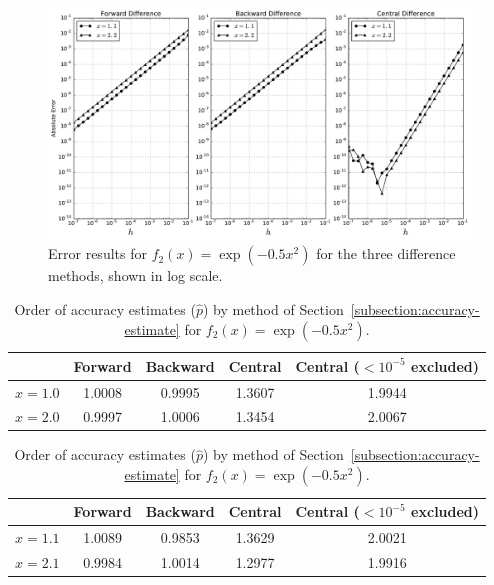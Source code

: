 \documentclass[11pt]{article}
\begin{document}
\begin{figure}[!hb]
    \centering
    \includegraphics[width=\textwidth]{../figures/f2.pdf}
    \caption{Error results for $f_2(x) = \exp(-0.5x^2)$ for the three difference methods, shown in log scale.}
    \label{fig:func2-results}
\end{figure}

\begin{table}[!ht]
    \centering
    \begin{tabular}{|c|c|c|c|c|}
        \hline
                & Forward & Backward & Central & Central ($< 10^{-5}$ excluded) \\
        \hline
        $x=1.0$ & 1.0008  & 0.9995   & 1.3607  & 1.9944 \\
        \hline
        $x=2.0$ & 0.9997  & 1.0006   & 1.3454  & 2.0067 \\
        \hline
    \end{tabular}
    \caption{Order of accuracy estimates ($\hat{p}$) by method of Section~\ref{subsection:accuracy-estimate} for $f_1(x) = \sin(x)$.}
    \label{tab:order-estimates-f1}

    \vspace{0.5in}

    \begin{tabular}{|c|c|c|c|c|}
        \hline
                & Forward & Backward & Central & Central ($< 10^{-5}$ excluded) \\
        \hline
        $x=1.1$ & 1.0089 & 0.9853   & 1.3629  & 2.0021  \\
        \hline
        $x=2.1$ & 0.9984 & 1.0014   & 1.2977  & 1.9916  \\
        \hline
    \end{tabular}
    \caption{Order of accuracy estimates ($\hat{p}$) by method of Section~\ref{subsection:accuracy-estimate} for $f_2(x) = \exp(-0.5x^2)$.}
    \label{tab:order-estimates-f2}
\end{table}
\end{document}
